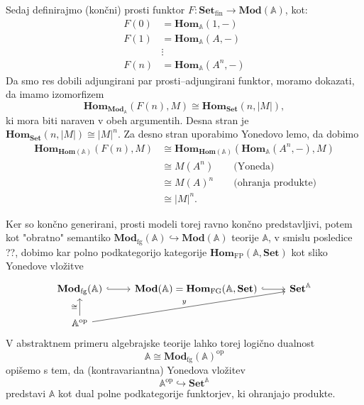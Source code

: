 \documentclass[../kategoricna_logika.tex]{subfiles}
\begin{document}
Sedaj definirajmo (končni) prosti funktor \(F : \mathbf{Set}_{ \mathrm{fin}} \to \mathbf{Mod}(\mathbb{A})\), 
kot:
\begin{align*}
F(0) &= \mathbf{Hom}_{\mathbb{A}}(1,-) \\
F(1) &= \mathbf{Hom}_{\mathbb{A}}(A,-) \\
&\vdots \\
F(n) &= \mathbf{Hom}_{\mathbb{A}}(A^n, -)
\end{align*}
Da smo res dobili adjungirani par prosti--adjungirani funktor, moramo dokazati, da
imamo izomorfizem
\[ \mathbf{Hom}_{\mathbf{Mod}_{\mathbb{A}}}(F(n), M) \cong \mathbf{Hom}_{\mathbf{Set}}(n, |M|), \]
ki mora biti naraven v obeh argumentih. Desna stran je 
\(\mathbf{Hom}_{\mathbf{Set}}(n, |M|) \cong |M|^n\).
Za desno stran uporabimo Yonedovo lemo, da dobimo
\begin{align*}
\mathbf{Hom}_{\mathbf{Hom}(\mathbb{A})}(F(n),M) &\cong  \mathbf{Hom}_{\mathbf{Hom}(\mathbb{A})}(\mathbf{Hom}_{\mathbb{A}}(A^n, -), M) \\
&\cong M(A^n) \qquad \text{(Yoneda)} \\
&\cong M(A)^n \qquad \text{(ohranja produkte)} \\
&\cong |M|^n.
\end{align*}

Ker so končno generirani, prosti modeli torej ravno končno predstavljivi, potem
kot "obratno" semantiko \(\mathbf{Mod}_{\mathrm{fg}}(\mathbb{A}) \hookrightarrow \mathbf{Mod}(\mathbb{A})\)
teorije \(\mathbb{A}\), v smislu posledice ??, dobimo kar polno podkategorijo kategorije
\(\mathbf{Hom}_{\mathrm{FP}}(\mathbb{A}, \mathbf{Set})\) kot sliko Yonedove vložitve
\begin{equation*}
\begin{tikzcd}
\mathbf{Mod}_{\mathrm{fg}}(\mathbb{A}) \ar[r, hook] & \mathbf{Mod}(\mathbb{A}) = \mathbf{Hom}_{\mathrm{FG}}(\mathbb{A}, \mathbf{Set}) \ar[r, hook] & \mathbf{Set}^{\mathbb{A}} \\
\mathbb{A}^{\mathrm{op}} \ar[u, "\cong"] \ar[urr, "y"]
\end{tikzcd}
\end{equation*}
V abstraktnem primeru algebrajske teorije lahko torej logično dualnost
\[ \mathbb{A} \cong \mathbf{Mod}_{\mathrm{fg}}(\mathbb{A})^{\mathrm{op}} \]
opišemo s tem, da (kontravariantna) Yonedova vložitev
\[ \mathbb{A}^{\mathrm{op}} \hookrightarrow \mathbf{Set}^{\mathbb{A}} \]
predstavi \(\mathbb{A}\) kot dual polne podkategorije funktorjev, ki ohranjajo produkte.
%
\end{document}
